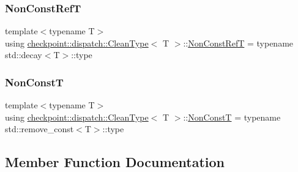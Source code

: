 \subsubsection{\texorpdfstring{Non\+Const\+RefT}{NonConstRefT}}
{\footnotesize\ttfamily template$<$typename T$>$ \\
using \hyperlink{structcheckpoint_1_1dispatch_1_1_clean_type}{checkpoint\+::dispatch\+::\+Clean\+Type}$<$ T $>$\+::\hyperlink{structcheckpoint_1_1dispatch_1_1_clean_type_a22ac8ae19000187cd7d3d218f3efa46e}{Non\+Const\+RefT} =  typename std\+::decay$<$T$>$\+::type}

\mbox{\label{structcheckpoint_1_1dispatch_1_1_clean_type_af8cc50327016b4a8410504e245edeb6f}} 
\subsubsection{\texorpdfstring{Non\+ConstT}{NonConstT}}
{\footnotesize\ttfamily template$<$typename T$>$ \\
using \hyperlink{structcheckpoint_1_1dispatch_1_1_clean_type}{checkpoint\+::dispatch\+::\+Clean\+Type}$<$ T $>$\+::\hyperlink{structcheckpoint_1_1dispatch_1_1_clean_type_af8cc50327016b4a8410504e245edeb6f}{Non\+ConstT} =  typename std\+::remove\+\_\+const$<$T$>$\+::type}



\subsection{Member Function Documentation}
\mbox{\label{structcheckpoint_1_1dispatch_1_1_clean_type_a7838d4676520ae8b8947a70691e63226}} 
